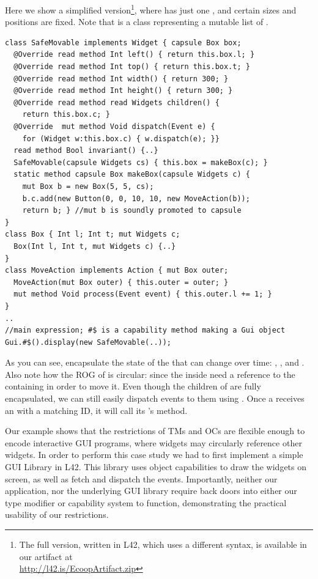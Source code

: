 Here we show a simplified version\footnote{The full version, written in L42, which uses a different syntax, is available in our artifact at\\ \url{http://l42.is/EcoopArtifact.zip}}, where  \Q@SafeMovable@ has just one \Q@Button@, and certain sizes and positions are fixed. Note that \Q@Widgets@ is a class representing a mutable list of \Q@mut@ \Q@Widget@s.
\begin{lstlisting}[mathescape=false]
class SafeMovable implements Widget { capsule Box box;
  @Override read method Int left() { return this.box.l; }
  @Override read method Int top() { return this.box.t; }
  @Override read method Int width() { return 300; }
  @Override read method Int height() { return 300; }
  @Override read method read Widgets children() {
    return this.box.c; }
  @Override  mut method Void dispatch(Event e) {
    for (Widget w:this.box.c) { w.dispatch(e); }}
  read method Bool invariant() {..}
  SafeMovable(capsule Widgets cs) { this.box = makeBox(c); }
  static method capsule Box makeBox(capsule Widgets c) {
    mut Box b = new Box(5, 5, cs);
    b.c.add(new Button(0, 0, 10, 10, new MoveAction(b));
    return b; } //mut b is soundly promoted to capsule
}
class Box { Int l; Int t; mut Widgets c;
  Box(Int l, Int t, mut Widgets c) {..}
}
class MoveAction implements Action { mut Box outer;
  MoveAction(mut Box outer) { this.outer = outer; }
  mut method Void process(Event event) { this.outer.l += 1; }
}
..
//main expression; #$ is a capability method making a Gui object
Gui.#$().display(new SafeMovable(..));
\end{lstlisting}

As you can see, \Q@Box@es encapsulate the state of the \Q@SafeMovable@s that can change over time:
\Q@left@, \Q@top@, and \Q@children@. Also note how the ROG of \Q@Box@ is circular: since
the \Q@MoveAction@s inside \Q@Button@s need a reference to the containing \Q@Box@ in order to move it.
Even though the children of \Q@SafeMovable@s are fully encapsulated, we can still easily dispatch events to them using \Q@dispatch@. Once a \Q@Button@ receives an \Q@Event@ with a matching ID, it will call its \Q@Action@'s \Q@process@ method. 

Our example shows that the restrictions of TMs and OCs are flexible enough to encode interactive GUI programs, where widgets may circularly reference other widgets.
In order to perform this case study we had to first implement a simple GUI Library in L42. This library uses object capabilities to draw the widgets on screen, as well as fetch and dispatch the events. Importantly, neither our application, nor the underlying GUI library require back doors into either our type modifier or capability system to function, demonstrating the practical usability of our restrictions.


